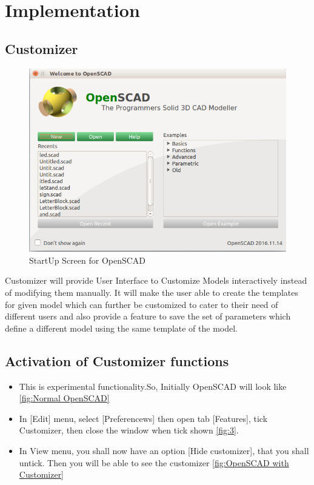 \section{Implementation}
\subsection{Customizer}

\begin{figure}
    \centering \includegraphics[scale=0.60]{images/output/1.png}
    \caption{StartUp Screen for OpenSCAD}
    \label{fig:1}
\end{figure}

Customizer  will provide User Interface to Customize Models interactively instead of modifying them manually. It will make the user able to create the templates for given model which can further be customized to cater to their need of different users and also provide a feature to save the set of parameters which define a different model using the same template of the model.
\subsection{Activation of Customizer functions}
\begin{itemize}
   
    \item This is experimental functionality.So, Initially
    OpenSCAD will look like \ref{fig:Normal OpenSCAD}
    \item In [Edit] menu, select [Preferencews] then open tab [Features], tick Customizer, then close the window when tick shown \ref{fig:3}.
    \item In View menu, you shall now have an option [Hide customizer], that you shall untick. Then you will be able to see the customizer \ref{fig:OpenSCAD with Customizer}
   
\end{itemize}

